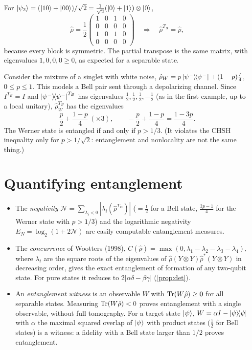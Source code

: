 \begin{example}
For $\left|\psi_2\right\rangle=(\left|10\right\rangle+\left|00\right\rangle)/\sqrt2=\frac1{\sqrt2}(\left|0\right\rangle+\left|1\right\rangle)\otimes\left|0\right\rangle$,
\begin{equation}
  \hat\rho=\frac12\begin{pmatrix}1&0&1&0\\0&0&0&0\\1&0&1&0\\0&0&0&0\end{pmatrix}\quad\Longrightarrow\quad\hat\rho^{T_B}=\hat\rho,
\end{equation}
because every block is symmetric. The partial transpose is the same matrix, with eigenvalues $1,0,0,0\ge0$, as expected for a separable state.
\end{example}

\begin{example}\label{ex:werner}
Consider the mixture of a singlet with white noise, $\hat\rho_W=p\left|\psi^-\middle\rangle\!\middle\langle\psi^-\right|+(1-p)\frac I4$, $0\le p\le1$. This models a Bell pair sent through a depolarizing channel.
Since $I^{T_B}=I$ and $\left|\psi^-\middle\rangle\!\middle\langle\psi^-\right|^{T_B}$ has eigenvalues $\frac12,\frac12,\frac12,-\frac12$ (as in the first example, up to a local unitary), $\hat\rho_W^{T_B}$ has the eigenvalues
\begin{equation}
  \frac p2+\frac{1-p}4\ (\times3),\qquad-\frac p2+\frac{1-p}4=\frac{1-3p}4.
\end{equation}
The Werner state is entangled if and only if $p>1/3$. (It violates the CHSH inequality only for $p>1/\sqrt2$: entanglement and nonlocality are not the same thing.)
\end{example}

\section{Quantifying entanglement}
\begin{itemize}
  \item The \emph{negativity} $\mathcal N=\sum_{\lambda_i<0}|\lambda_i(\hat\rho^{T_B})|$ ($=\frac12$ for a Bell state, $\frac{3p-1}4$ for the Werner state with $p>1/3$) and the
  logarithmic negativity $E_N=\log_2(1+2\mathcal N)$ are easily computable entanglement measures.
  \item The \emph{concurrence} of Wootters (1998), $C(\hat\rho)=\max(0,\lambda_1-\lambda_2-\lambda_3-\lambda_4)$, where $\lambda_i$ are the square roots of the eigenvalues of
  $\hat\rho(Y\otimes Y)\hat\rho^*(Y\otimes Y)$ in decreasing order, gives the exact entanglement of formation of any two-qubit state. For pure states it reduces to
  $2|\alpha\delta-\beta\gamma|$ (\cref{prop:det}).
  \item An \emph{entanglement witness} is an observable $W$ with $\operatorname{Tr}(W\hat\rho)\ge0$ for all separable states. Measuring $\operatorname{Tr}(W\hat\rho)<0$ proves entanglement with a single
  observable, without full tomography. For a target state $\left|\psi\right\rangle$, $W=\alpha I-\left|\psi\middle\rangle\!\middle\langle\psi\right|$ with $\alpha$ the maximal squared overlap of $\left|\psi\right\rangle$ with product states ($\frac12$
  for Bell states) is a witness: a fidelity with a Bell state larger than $1/2$ proves entanglement.
\end{itemize}

